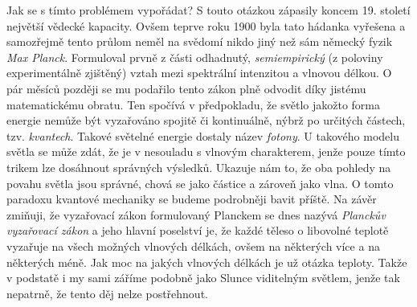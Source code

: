\documentclass{../../../../style/mkimain}
\begin{document}
Jak se s tímto problémem vypořádat? S touto otázkou zápasily koncem 19. století největší vědecké kapacity.
Ovšem teprve roku 1900 byla tato hádanka vyřešena a samozřejmě tento průlom neměl na svědomí nikdo jiný než sám německý fyzik \textit{Max Planck}.
Formuloval prvně z části odhadnutý, \textit{semiempirický} (z poloviny experimentálně zjištěný) vztah mezi spektrální intenzitou a vlnovou délkou.
O pár měsíců později se mu podařilo tento zákon plně odvodit díky jistému matematickému obratu.
Ten spočívá v předpokladu,
že světlo jakožto forma energie nemůže být vyzařováno spojitě či kontinuálně, nýbrž po určitých částech, tzv. \textit{kvantech}.
Takové  světelné energie dostaly název \textit{fotony}.
U takového modelu světla se může zdát, že je v nesouladu s vlnovým charakterem, jenže pouze tímto trikem lze dosáhnout správných výsledků.
Ukazuje nám to, že oba pohledy na povahu světla jsou správné, chová se jako částice a zároveň jako vlna.
O tomto paradoxu kvantové mechaniky se budeme podrobněji bavit příště. Na závěr zmiňuji,
že vyzařovací zákon formulovaný Planckem se dnes nazývá \textit{Planckův vyzařovací zákon} a jeho hlavní poselství je,
že každé těleso o libovolné teplotě vyzařuje na všech možných vlnových délkách, ovšem na některých více a na některých méně.
Jak moc na jakých vlnových délkách je už otázka teploty. Takže v podstatě i my sami záříme podobně jako Slunce viditelným světlem,
jenže tak nepatrně, že tento děj nelze postřehnout.
\\
\end{document}
